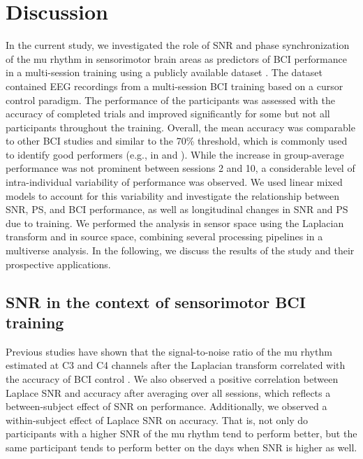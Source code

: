 \section{Discussion} \label{sec:discuss}

In the current study, we investigated the role of SNR and phase synchronization of the mu rhythm in sensorimotor brain areas as predictors of BCI performance in a multi-session training using a publicly available dataset \citep{Stieger2021_dataset}. The dataset contained EEG recordings from a multi-session BCI training based on a cursor control paradigm. The performance of the participants was assessed with the accuracy of completed trials and improved significantly for some but not all participants throughout the training. Overall, the mean accuracy was comparable to other BCI studies and similar to the 70\% threshold, which is commonly used to identify good performers (e.g., in \cite{Sannelli2019} and \cite{Leeuwis2021}). While the increase in group-average performance was not prominent between sessions 2 and 10, a considerable level of intra-individual variability of performance was observed. We used linear mixed models to account for this variability and investigate the relationship between SNR, PS, and BCI performance, as well as longitudinal changes in SNR and PS due to training. We performed the analysis in sensor space using the Laplacian transform and in source space, combining several processing pipelines in a multiverse analysis. In the following, we discuss the results of the study and their prospective applications.

\subsection{SNR in the context of sensorimotor BCI training}

Previous studies have shown that the signal-to-noise ratio of the mu rhythm estimated at C3 and C4 channels after the Laplacian transform correlated with the accuracy of BCI control \citep{Blankertz2010, Acqualagna2016, Sannelli2019}. We also observed a positive correlation between Laplace SNR and accuracy after averaging over all sessions, which reflects a between-subject effect of SNR on performance. Additionally, we observed a within-subject effect of Laplace SNR on accuracy. That is, not only do participants with a higher SNR of the mu rhythm tend to perform better, but the same participant tends to perform better on the days when SNR is higher as well. 

